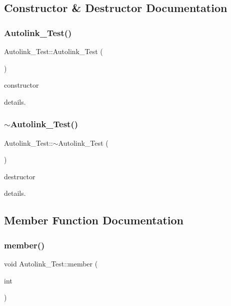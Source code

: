\subsection{Constructor \& Destructor Documentation}
\mbox{\label{class_autolink___test_a278d631f9943428c05b17d78f14488e2}} 
\subsubsection{\texorpdfstring{Autolink\_Test()}{Autolink\_Test()}}
{\footnotesize\ttfamily Autolink\+\_\+\+Test\+::\+Autolink\+\_\+\+Test (\begin{DoxyParamCaption}{ }\end{DoxyParamCaption})}



constructor 

details. \mbox{\label{class_autolink___test_a03bf46c8e2b733680035f524fd7b193b}} 
\subsubsection{\texorpdfstring{$\sim$Autolink\_Test()}{~Autolink\_Test()}}
{\footnotesize\ttfamily Autolink\+\_\+\+Test\+::$\sim$\+Autolink\+\_\+\+Test (\begin{DoxyParamCaption}{ }\end{DoxyParamCaption})}



destructor 

details. 

\subsection{Member Function Documentation}
\mbox{\label{class_autolink___test_a393ea281f235a2f603d98daf72b0d411}} 
\subsubsection{\texorpdfstring{member()}{member()}\hspace{0.1cm}{\footnotesize\ttfamily [1/2]}}
{\footnotesize\ttfamily void Autolink\+\_\+\+Test\+::member (\begin{DoxyParamCaption}\item[{int}]{ }\end{DoxyParamCaption})}

